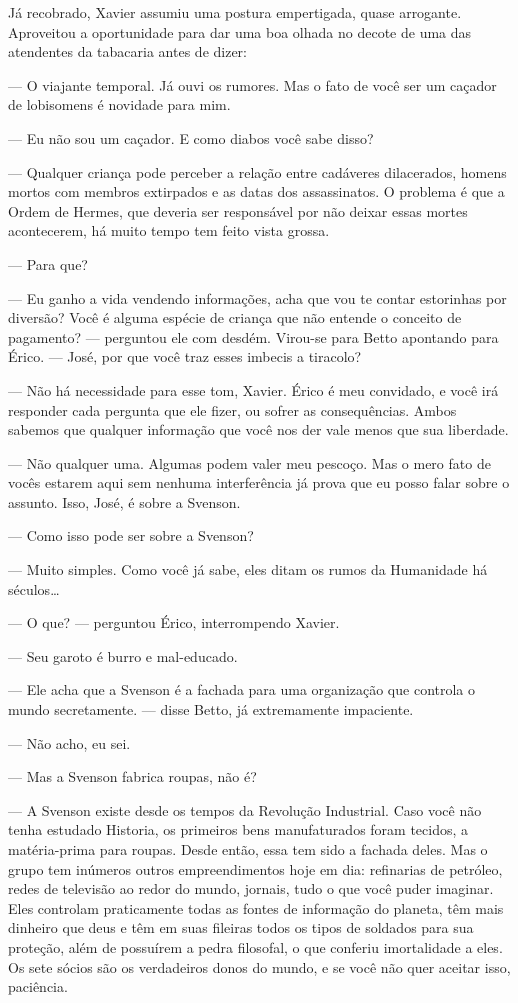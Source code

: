 Já recobrado, Xavier assumiu uma postura empertigada, quase arrogante.
Aproveitou a oportunidade para dar uma boa olhada no decote de uma das
atendentes da tabacaria antes de dizer:

--- O viajante temporal. Já ouvi os rumores. Mas o fato de você ser um
caçador de lobisomens é novidade para mim.

--- Eu não sou um caçador. E como diabos você sabe disso?

--- Qualquer criança pode perceber a relação entre cadáveres
dilacerados, homens mortos com membros extirpados e as datas dos
assassinatos. O problema é que a Ordem de Hermes, que deveria ser
responsável por não deixar essas mortes acontecerem, há muito tempo tem
feito vista grossa.

--- Para que?

--- Eu ganho a vida vendendo informações, acha que vou te contar
estorinhas por diversão? Você é alguma espécie de criança que não
entende o conceito de pagamento? --- perguntou ele com desdém. Virou-se
para Betto apontando para Érico. --- José, por que você traz esses
imbecis a tiracolo?

--- Não há necessidade para esse tom, Xavier. Érico é meu convidado, e
você irá responder cada pergunta que ele fizer, ou sofrer as
consequências. Ambos sabemos que qualquer informação que você nos der
vale menos que sua liberdade.

--- Não qualquer uma. Algumas podem valer meu pescoço. Mas o mero fato
de vocês estarem aqui sem nenhuma interferência já prova que eu posso
falar sobre o assunto. Isso, José, é sobre a Svenson.

--- Como isso pode ser sobre a Svenson?

--- Muito simples. Como você já sabe, eles ditam os rumos da Humanidade
há séculos\ldots

--- O que? --- perguntou Érico, interrompendo Xavier.

--- Seu garoto é burro e mal-educado.

--- Ele acha que a Svenson é a fachada para uma organização que controla
o mundo secretamente. --- disse Betto, já extremamente impaciente.

--- Não acho, eu sei.

--- Mas a Svenson fabrica roupas, não é?

--- A Svenson existe desde os tempos da Revolução Industrial. Caso você
não tenha estudado Historia, os primeiros bens manufaturados foram
tecidos, a matéria-prima para roupas. Desde então, essa tem sido a
fachada deles. Mas o grupo tem inúmeros outros empreendimentos hoje em
dia: refinarias de petróleo, redes de televisão ao redor do mundo,
jornais, tudo o que você puder imaginar. Eles controlam praticamente
todas as fontes de informação do planeta, têm mais dinheiro que deus e
têm em suas fileiras todos os tipos de soldados para sua proteção, além
de possuírem a pedra filosofal, o que conferiu imortalidade a eles. Os
sete sócios são os verdadeiros donos do mundo, e se você não quer
aceitar isso, paciência.

